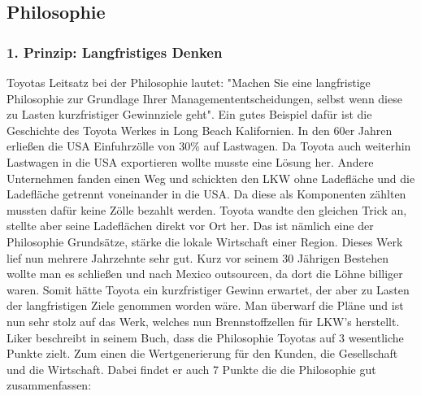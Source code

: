 \documentclass[a4paper,12pt]{scrartcl}
\begin{document}
\subsection{Philosophie}



\subsubsection{1. Prinzip: Langfristiges Denken}

Toyotas Leitsatz bei der Philosophie lautet: "Machen Sie eine langfristige Philosophie zur Grundlage Ihrer Managemententscheidungen, selbst wenn diese zu Lasten kurzfristiger Gewinnziele geht". Ein gutes Beispiel dafür ist die Geschichte des Toyota Werkes in Long Beach Kalifornien. In den 60er Jahren erließen die USA Einfuhrzölle von 30\% auf Lastwagen. Da Toyota auch weiterhin Lastwagen in die USA exportieren wollte musste eine Lösung her. Andere Unternehmen fanden einen Weg und schickten den LKW ohne Ladefläche und die Ladefläche getrennt voneinander in die USA. Da diese als Komponenten zählten mussten dafür keine Zölle bezahlt werden. Toyota wandte den gleichen Trick an, stellte aber seine Ladeflächen direkt vor Ort her. Das ist nämlich eine der Philosophie Grundsätze, stärke die lokale Wirtschaft einer Region. Dieses Werk lief nun mehrere Jahrzehnte sehr gut. Kurz vor seinem 30 Jährigen Bestehen wollte man es schließen und nach Mexico outsourcen, da dort die Löhne billiger waren. Somit hätte Toyota ein kurzfristiger Gewinn erwartet, der aber zu Lasten der langfristigen Ziele genommen worden wäre. Man überwarf die Pläne und ist nun sehr stolz auf das Werk, welches nun Brennstoffzellen für LKW's herstellt.
Liker beschreibt in seinem Buch, dass die Philosophie Toyotas auf 3 wesentliche Punkte zielt. Zum einen die Wertgenerierung für den Kunden, die Gesellschaft und die Wirtschaft. Dabei findet er auch 7 Punkte die die Philosophie gut zusammenfassen:
\end{document}
